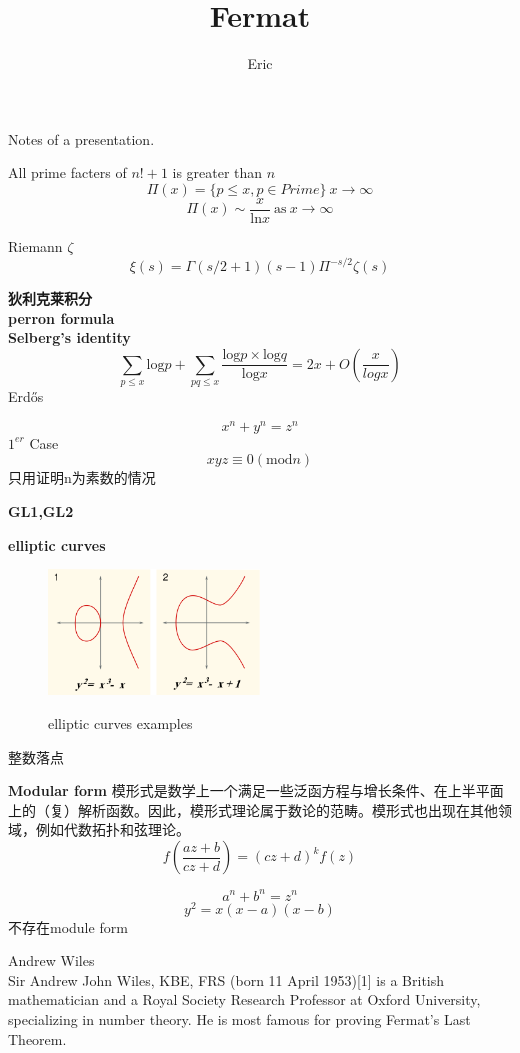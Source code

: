 \documentclass{article}
\begin{document}
\title{Fermat}
\author{Eric}
\newpage
Notes of a presentation.\par

All prime facters of $n!+1$ is greater than $n$
$$\Pi (x)=\{p\leq x,p \in Prime\} ~ x \rightarrow \infty$$
$$\Pi(x) \sim \frac{x}{\text{ln} x}~ \text{as} ~x \rightarrow \infty$$

Riemann $\zeta$
\begin{equation}
\xi(s) = \Gamma(s/2+1 )(s-1) \Pi^{-s/2} \zeta(s)
\end{equation}


\textbf{狄利克莱积分}\\
\textbf{perron formula}\\

\textbf{Selberg's identity}
$$
\sum_{p \leq x}\text{log} p + \sum_{pq \leq x}\frac{\text{log}p \times \text{log} q}{\text{log} x}=2x+O(\frac{x}{log x})
$$
Erd\H{o}s

\begin{equation}
 x^n + y^n =z^n
 \label{Fermat}
\end{equation}
$1^{er}$ Case $$xyz \equiv 0(\text{mod} n)$$
只用证明n为素数的情况

\textbf{GL1,GL2}


\textbf{elliptic curves}
\begin{figure}
  \includegraphics[width=0.5\textwidth]{./image/ECClines}\\
  \caption{elliptic curves examples}\label{elliptic curves}
\end{figure}
整数落点

\textbf{Modular form}
模形式是数学上一个满足一些泛函方程与增长条件、在上半平面上的（复）解析函数。因此，模形式理论属于数论的范畴。模形式也出现在其他领域，例如代数拓扑和弦理论。
\begin{equation}
 f(\frac{ az+b}{cz+d})=(cz+d)^k f(z)
\end{equation}

$$a^n + b^n =z^n$$
$$y^2=x(x-a)(x-b)$$ 不存在module form

Andrew Wiles\\
Sir Andrew John Wiles, KBE, FRS (born 11 April 1953)[1] is a British mathematician and a Royal Society Research Professor at Oxford University, specializing in number theory. He is most famous for proving Fermat's Last Theorem.
\end{document}

